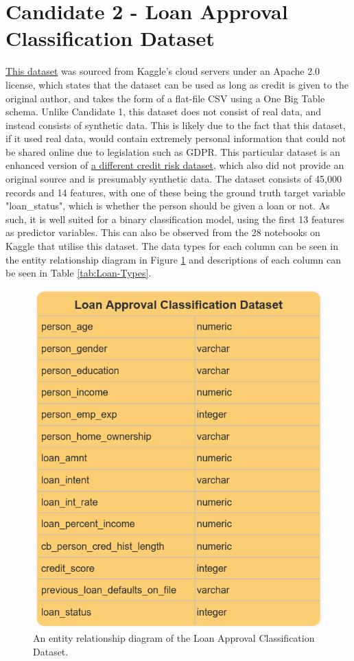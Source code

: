 \documentclass[12pt]{report}
\begin{document}
\section{Candidate 2 - Loan Approval Classification Dataset}
\href{https://www.kaggle.com/datasets/taweilo/loan-approval-classification-data}{This dataset} was sourced from Kaggle's cloud servers under 
an Apache 2.0 license, which states that the dataset can be used as long as credit is given to the original author,
and takes the form of a flat-file CSV using a One Big Table schema. Unlike Candidate 1, this dataset does not consist of real data, and 
instead consists of synthetic data. This is likely due to the fact that this dataset, if it used real data, would contain extremely personal 
information that could not be shared online due to legislation such as GDPR. This particular dataset is an enhanced version of \href{https://www.kaggle.com/datasets/laotse/credit-risk-dataset}{a different credit risk dataset},
which also did not provide an original source and is presumably synthetic data. The dataset consists of 45,000 records and 14 features, with 
one of these being the ground truth target variable "loan\_status", which is whether the person should be given a loan or not. As such, it is well suited 
for a binary classification model, using the first 13 features as predictor variables. This can also be observed from the 28 notebooks on Kaggle that 
utilise this dataset. The data types for each column can be seen in the entity relationship diagram in Figure \ref{fig:Loan-ERD} and 
descriptions of each column can be seen in Table \ref{tab:Loan-Types}.

\begin{figure}[H]
    \centering
    \includegraphics[width=.75\linewidth]{Loan-ERD.png}
    \caption{An entity relationship diagram of the Loan Approval Classification Dataset.}
    \label{fig:Loan-ERD}
\end{figure}
\end{document}
